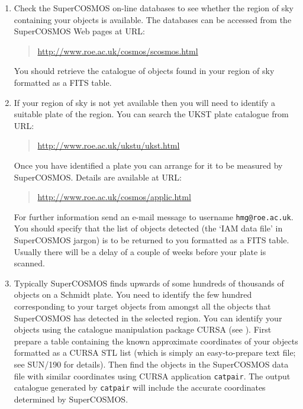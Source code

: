 \documentclass[chapters,twoside,11pt]{starlink}
\begin{document}
\begin{enumerate}

  \item Check the SuperCOSMOS on-line databases to see whether the
   region of sky containing your objects is available.  The databases
   can be accessed from the SuperCOSMOS Web pages at URL:

  \begin{quote}
\url{http://www.roe.ac.uk/cosmos/scosmos.html}
  \end{quote}

   You should retrieve the catalogue of objects found in your region
   of sky formatted as a FITS table.

  \item If your region of sky is not yet available then you will need to
   identify a suitable plate of the region.  You can search the UKST plate
   catalogue from URL:

  \begin{quote}
\url{http://www.roe.ac.uk/ukstu/ukst.html}
  \end{quote}

   Once you have identified a plate you can arrange for it to be measured
   by SuperCOSMOS.  Details are available at URL:

  \begin{quote}
\url{http://www.roe.ac.uk/cosmos/applic.html}
  \end{quote}

   For further information send an e-mail message to username \texttt{hmg@roe.ac.uk}.  You should specify that the list of objects
   detected (the `IAM data file' in SuperCOSMOS jargon) is to be
   returned to you formatted as a FITS table.  Usually there will be
   a delay of a couple of weeks before your plate is scanned.

  \item Typically SuperCOSMOS finds upwards of some hundreds of thousands
   of objects on a Schmidt plate.  You need to identify the few hundred
   corresponding to your target objects from amongst all the objects that
   SuperCOSMOS has detected in the selected region.  You can identify your
   objects using the catalogue manipulation package CURSA (see
   \cite{SUN190}).  First prepare a table
   containing the known approximate coordinates of your objects
   formatted as a CURSA STL list (which is simply an easy-to-prepare
   text file; see SUN/190 for details).  Then find the objects in the
   SuperCOSMOS data file with similar coordinates using CURSA application
   \texttt{catpair}.  The output catalogue generated by \texttt{catpair} will
   include the accurate coordinates determined by SuperCOSMOS.

\end{enumerate}
\end{document}
